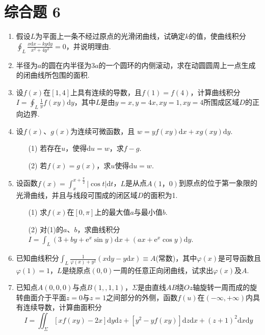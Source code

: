 \section{综合题 6}
\begin{enumerate}
	\item 假设$L$为平面上一条不经过原点的光滑闭曲线，试确定$k$的值，使曲线积分$\oint_{L} \frac{x \mathrm{d} x-k y \mathrm{d} y}{x^{2}+4 y^{2}}=0$，并说明理由.
	
	\item 半径为$a$的圆在内半径为$3a$的一个圆环的内侧滚动，求在动圆圆周上一点生成的闭曲线所包围的面积.
	\item 设$f(x)$在$[1,4]$上具有连续的导数，且$f(1)=f(4)$，计算曲线积分$I=\oint_{L} \frac{1}{y} f(x y) \mathrm{d} y$，其中$L$是由$y=x, y=4 x, x y=1, x y=4$所围成区域$D$的正向边界.
	\item 设$f(x)$、$g(x)$为连续可微函数，且	$w=y f(x y) \mathrm{d} x+x g(x y) \mathrm{d} y$.
	\begin{enumerate}
		\item [(1)]若存在$u$，使得$ \mathrm{d}u=w$，求$f-g$.
		
		\item [(2)]若$f(x)=g(x)$，求$u$使得$ \mathrm{d}u=w$.
		
	\end{enumerate}
	\item 设函数$f(x)=\int_{x}^{x+\frac{\pi}{2}}|\cos t| \mathrm{d} t$，$L$是从点$A(1，0)$到原点的位于第一象限的光滑曲线，并且与线段可围成的闭区域$D$的面积为1.
	\begin{enumerate}
		\item [(1)]求$f(x)$在$[0,\pi]$上的最大值$a$与最小值$b$.
		\item [(2)] 对(1)的$a$、$b$，求曲线积分$I=\int_{L}\left(3+b y+\mathrm{e}^{x} \sin y\right) \mathrm{d} x+\left(a x+\mathrm{e}^{x} \cos y\right) \mathrm{d} y$.
	\end{enumerate}
	\item 已知曲线积分$\int_{L} \frac{1}{\varphi(x)+y^{2}}(x \mathrm{d} y-y \mathrm{d} x) \equiv A$(常数)，其中$\varphi(x)$是可导函数且$\varphi(1)=1$，$L$是绕原点$(0,0)$一周的任意正向闭曲线，试求出$\varphi(x)$及$A$.
	
	\item 已知点$A(0,0,0)$与点$B(1,,1,1)$，$\Sigma$是由直线$AB$绕$Oz$轴旋转一周而成的旋转曲面介于平面$z=0$与$z=1$之间部分的外侧，函数$f(u)$在$(-\infty,+\infty)$内具有连续导数，计算曲面积分
	\[
	I=\iint_{\Sigma}[x f(x y)-2 x] \mathrm{d} y \mathrm{d} z+\left[y^{2}-y f(x y)\right] \mathrm{d} z \mathrm{d} x+(z+1)^{2} \mathrm{d} x \mathrm{d} y
	\]
	

\end{enumerate}
